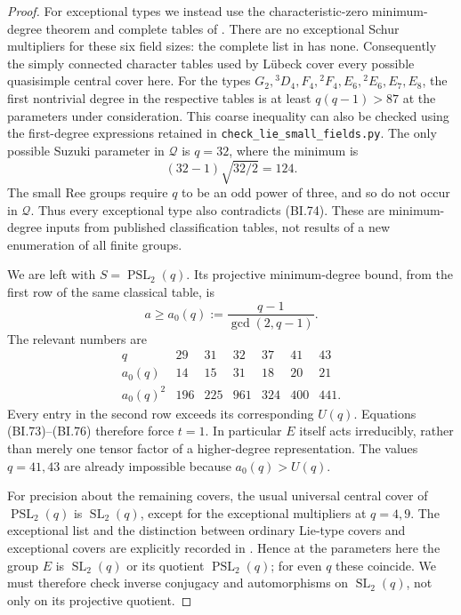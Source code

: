 \begin{proof}
For exceptional types we instead use the characteristic-zero
minimum-degree theorem and complete tables of
\cite[Theorem~2.1 and \S5]{BI:Luebeck}.  There are no exceptional
Schur multipliers for these six field sizes: the complete list in
\cite[Chapter~5, Table~1, numbered p.~35]{BI:HHM} has none.
Consequently the simply connected character tables used by
L\"ubeck cover every possible quasisimple central cover here.
For the types $G_2,{}^3D_4,F_4,{}^2F_4,E_6,{}^2E_6,E_7,E_8$,
the first nontrivial degree in the respective tables is at least
$q(q-1)>87$ at the parameters under consideration.  This coarse
inequality can also be checked using the first-degree expressions
retained in \texttt{check\_lie\_small\_fields.py}.
The only possible Suzuki parameter in $\mathcal Q$ is $q=32$,
where the minimum is
\[
                         (32-1)\sqrt{32/2}=124.
\]
The small Ree groups require $q$ to be an odd power of three, and
so do not occur in $\mathcal Q$.  Thus every exceptional type
also contradicts (BI.74).  These are minimum-degree inputs from
published classification tables, not results of a new enumeration
of all finite groups.

We are left with $S=\operatorname{PSL}_2(q)$.  Its projective
minimum-degree bound, from the first row of the same classical
table, is
\[
 a\ge a_0(q):=\frac{q-1}{\gcd(2,q-1)}.
\]
The relevant numbers are
\[
\begin{array}{c|rrrrrr}
q&29&31&32&37&41&43\\ \hline
a_0(q)&14&15&31&18&20&21\\
a_0(q)^2&196&225&961&324&400&441.
\end{array}                                                   \tag{BI.76}
\]
Every entry in the second row exceeds its corresponding $U(q)$.
Equations (BI.73)--(BI.76) therefore force $t=1$.  In particular
$E$ itself acts irreducibly, rather than merely one tensor factor
of a higher-degree representation.  The values $q=41,43$ are
already impossible because $a_0(q)>U(q)$.

For precision about the remaining covers, the usual universal
central cover of $\operatorname{PSL}_2(q)$ is
$\operatorname{SL}_2(q)$, except for the exceptional multipliers
at $q=4,9$.  The exceptional list and the distinction between
ordinary Lie-type covers and exceptional covers are explicitly
recorded in \cite[Introduction, numbered p.~4; Chapter~5,
Table~1, numbered p.~35]{BI:HHM}.  Hence at the parameters here
the group $E$ is $\operatorname{SL}_2(q)$ or its quotient
$\operatorname{PSL}_2(q)$; for even $q$ these coincide.  We must
therefore check inverse conjugacy and automorphisms on
$\operatorname{SL}_2(q)$, not only on its projective quotient.


\end{proof}
